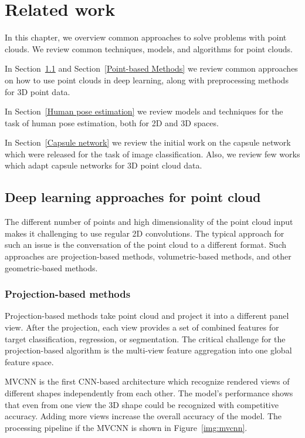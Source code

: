 \chapter{Related work}
\label{Related work}

In this chapter, we overview common approaches to solve problems with point clouds. We review common techniques, models, and algorithms for point clouds.

In Section~\ref{Deep learning approaches for point cloud} and Section~\ref{Point-based Methods} we review common approaches on how to use point clouds in deep learning, along with preprocessing methods for 3D point data.

In Section~\ref{Human pose estimation} we review models and techniques for the task of human pose estimation, both for 2D and 3D spaces.

In Section~\ref{Capsule network} we review the initial work on the capsule network which were released for the task of image classification. Also, we review few works which adapt capsule networks for 3D point cloud data.

\section{Deep learning approaches for point cloud}
\label{Deep learning approaches for point cloud}
The different number of points and high dimensionality of the point cloud input makes it challenging to use regular 2D convolutions. The typical approach for such an issue is the conversation of the point cloud to a different format. Such approaches are projection-based methods, volumetric-based methods, and other geometric-based methods.
\subsection{Projection-based methods} 
Projection-based methods take point cloud and project it into a different panel view. After the projection, each view provides a set of combined features for target classification, regression, or segmentation. The critical challenge for the projection-based algorithm is the multi-view feature aggregation into one global feature space.

MVCNN \parencite{su_multi-view_2015} is the first CNN-based architecture which recognize rendered views of different shapes independently from each other. The model's performance shows that even from one view the 3D shape could be recognized with competitive accuracy. Adding more views increase the overall accuracy of the model. The processing pipeline if the MVCNN is shown in Figure~\ref{img:mvcnn}.

